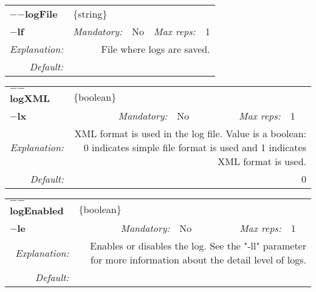 \begin{center}\begin{tabular}{|rr|rl|rl|}
\hline
\multicolumn{2}{|l|}{\textbf{$-$$-$logFile}} & \multicolumn{4}{|l|}{$\{$string$\}$} \\
\cline{3-6}
\multicolumn{2}{|l|}{\textbf{$-$lf}} & \emph{Mandatory:} & No & \emph{Max reps:} & 1 \\
\hline
\emph{Explanation:} & \multicolumn{5}{|p{12cm}|}{File where logs are saved.} \\
\hline
\emph{Default:} & \multicolumn{5}{|p{12cm}|}{} \\
\hline
\end{tabular}\end{center}
\begin{center}\begin{tabular}{|rr|rl|rl|}
\hline
\multicolumn{2}{|l|}{\textbf{$-$$-$logXML}} & \multicolumn{4}{|l|}{$\{$boolean$\}$} \\
\cline{3-6}
\multicolumn{2}{|l|}{\textbf{$-$lx}} & \emph{Mandatory:} & No & \emph{Max reps:} & 1 \\
\hline
\emph{Explanation:} & \multicolumn{5}{|p{12cm}|}{XML format is used in the log file. Value is a boolean: 0 indicates simple file format is used and 1 indicates XML format is used.} \\
\hline
\emph{Default:} & \multicolumn{5}{|p{12cm}|}{0} \\
\hline
\end{tabular}\end{center}

\begin{center}\begin{tabular}{|rr|rl|rl|}
\hline
\multicolumn{2}{|l|}{\textbf{$-$$-$logEnabled}} & \multicolumn{4}{|l|}{$\{$boolean$\}$} \\
\cline{3-6}
\multicolumn{2}{|l|}{\textbf{$-$le}} & \emph{Mandatory:} & No & \emph{Max reps:} & 1 \\
\hline
\emph{Explanation:} & \multicolumn{5}{|p{12cm}|}{Enables or disables the log. See the "-ll" parameter for more information about the detail level of logs.} \\
\hline
\emph{Default:} & \multicolumn{5}{|p{12cm}|}{} \\
\hline
\end{tabular}\end{center}

